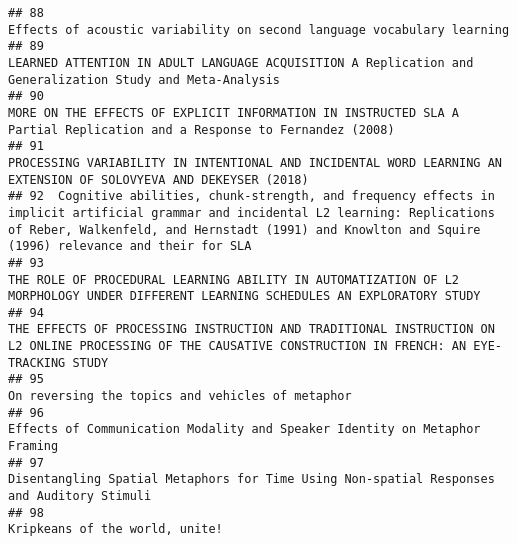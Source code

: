 \documentclass[
  english,
  man]{apa6}
\begin{document}
\begin{verbatim}
## 88                                                                                                                                                                    Effects of acoustic variability on second language vocabulary learning
## 89                                                                                                                                  LEARNED ATTENTION IN ADULT LANGUAGE ACQUISITION A Replication and Generalization Study and Meta-Analysis
## 90                                                                                                                    MORE ON THE EFFECTS OF EXPLICIT INFORMATION IN INSTRUCTED SLA A Partial Replication and a Response to Fernandez (2008)
## 91                                                                                                                          PROCESSING VARIABILITY IN INTENTIONAL AND INCIDENTAL WORD LEARNING AN EXTENSION OF SOLOVYEVA AND DEKEYSER (2018)
## 92  Cognitive abilities, chunk-strength, and frequency effects in implicit artificial grammar and incidental L2 learning: Replications of Reber, Walkenfeld, and Hernstadt (1991) and Knowlton and Squire (1996) relevance and their for SLA
## 93                                                                                                        THE ROLE OF PROCEDURAL LEARNING ABILITY IN AUTOMATIZATION OF L2 MORPHOLOGY UNDER DIFFERENT LEARNING SCHEDULES AN EXPLORATORY STUDY
## 94                                                                                  THE EFFECTS OF PROCESSING INSTRUCTION AND TRADITIONAL INSTRUCTION ON L2 ONLINE PROCESSING OF THE CAUSATIVE CONSTRUCTION IN FRENCH: AN EYE-TRACKING STUDY
## 95                                                                                                                                                                                          On reversing the topics and vehicles of metaphor
## 96                                                                                                                                                                Effects of Communication Modality and Speaker Identity on Metaphor Framing
## 97                                                                                                                                                 Disentangling Spatial Metaphors for Time Using Non-spatial Responses and Auditory Stimuli
## 98                                                                                                                                                                                                            Kripkeans of the world, unite!

\end{verbatim}
\end{document}
